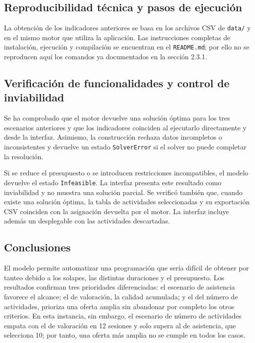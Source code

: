 \subsection{Reproducibilidad técnica y pasos de ejecución}

La obtención de los indicadores anteriores se basa en los archivos CSV de
\texttt{data/} y en el mismo motor que utiliza la aplicación. Las instrucciones
completas de instalación, ejecución y compilación se encuentran en el
\texttt{README.md}; por ello no se reproducen aquí los comandos ya documentados
en la sección 2.3.1.

\subsection{Verificación de funcionalidades y control de inviabilidad}

Se ha comprobado que el motor devuelve una solución óptima para los tres
escenarios anteriores y que los indicadores coinciden al ejecutarlo directamente
y desde la interfaz. Asimismo, la construcción rechaza datos incompletos o
inconsistentes y devuelve un estado \texttt{SolverError} si el solver no puede
completar la resolución.

Si se reduce el presupuesto o se introducen restricciones incompatibles, el
modelo devuelve el estado \texttt{Infeasible}. La interfaz presenta este
resultado como inviabilidad y no muestra una solución parcial. Se verificó
también que, cuando existe una solución óptima, la tabla de actividades
seleccionadas y su exportación CSV coinciden con la asignación devuelta por el
motor. La interfaz incluye además un desplegable con las actividades
descartadas.

\subsection{Conclusiones}

El modelo permite automatizar una programación que sería difícil de obtener
por tanteo debido a los solapes, las distintas duraciones y el presupuesto.
Los resultados confirman tres prioridades diferenciadas: el escenario de
asistencia favorece el alcance; el de valoración, la calidad acumulada; y el
del número de actividades, prioriza una oferta amplia sin abandonar por
completo los otros criterios. En esta instancia, sin embargo, el escenario de
número de actividades empata con el de valoración en 12 sesiones y solo supera
al de asistencia, que selecciona 10; por tanto, una oferta más amplia no se
cumple en todos los casos.

